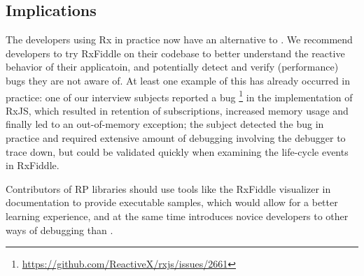 \subsection{Implications} The developers using Rx in practice now have
an alternative to \printfdebugging{}.  We recommend developers to try
RxFiddle on their codebase to better understand the reactive behavior of
their applicatoin, and potentially detect and verify (performance) bugs
they are not aware of.  At least one example of this has already
occurred in practice:  one of our interview subjects reported a bug%
\footnote{\url{https://github.com/ReactiveX/rxjs/issues/2661}} in the
 implementation of RxJS, which resulted in retention of
subscriptions, increased memory usage and finally led to an
out-of-memory exception; the subject detected the bug in practice and
required extensive amount of debugging involving the \NodeJS{} debugger
to trace down, but could be validated quickly when examining the
life-cycle events in RxFiddle.

Contributors of RP libraries should use tools like the RxFiddle
visualizer in documentation to provide executable samples, which would
allow for a better learning experience, and at the same time introduces
novice developers to other ways of debugging than \printfdebugging{}.
